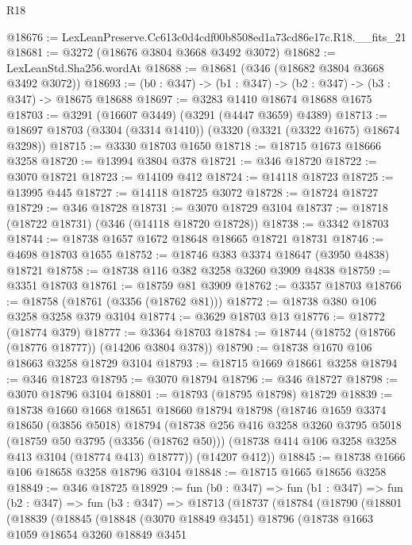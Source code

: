 \begin{lexlean}{R18}
\begin{coremodule}
@18676 := LexLeanPreserve.Cc613c0d4cdf00b8508ed1a73cd86e17c.R18.__fits_21
@18681 := @3272 (@18676 @3804 @3668 @3492 @3072)
@18682 := LexLeanStd.Sha256.wordAt
@18688 := @18681 (@346 (@18682 @3804 @3668 @3492 @3072))
@18693 := (b0 : @347) -> (b1 : @347) -> (b2 : @347) -> (b3 : @347) -> @18675 @18688
@18697 := @3283 @1410 @18674 @18688 @1675
@18703 := @3291 (@16607 @3449) (@3291 (@4447 @3659) @4389)
@18713 := @18697 @18703 (@3304 (@3314 @1410)) (@3320 (@3321 (@3322 @1675) @18674 @3298))
@18715 := @3330 @18703 @1650
@18718 := @18715 @1673 @18666 @3258
@18720 := @13994 @3804 @378
@18721 := @346 @18720
@18722 := @3070 @18721
@18723 := @14109 @412
@18724 := @14118 @18723
@18725 := @13995 @445
@18727 := @14118 @18725 @3072
@18728 := @18724 @18727
@18729 := @346 @18728
@18731 := @3070 @18729 @3104
@18737 := @18718 (@18722 @18731) (@346 (@14118 @18720 @18728))
@18738 := @3342 @18703
@18744 := @18738 @1657 @1672 @18648 @18665 @18721 @18731
@18746 := @4698 @18703 @1655
@18752 := @18746 @383 @3374 @18647 (@3950 @4838) @18721
@18758 := @18738 @116 @382 @3258 @3260 @3909 @4838
@18759 := @3351 @18703
@18761 := @18759 @81 @3909
@18762 := @3357 @18703
@18766 := @18758 (@18761 (@3356 (@18762 @81)))
@18772 := @18738 @380 @106 @3258 @3258 @379 @3104
@18774 := @3629 @18703 @13
@18776 := @18772 (@18774 @379)
@18777 := @3364 @18703
@18784 := @18744 (@18752 (@18766 (@18776 @18777)) (@14206 @3804 @378))
@18790 := @18738 @1670 @106 @18663 @3258 @18729 @3104
@18793 := @18715 @1669 @18661 @3258
@18794 := @346 @18723
@18795 := @3070 @18794
@18796 := @346 @18727
@18798 := @3070 @18796 @3104
@18801 := @18793 (@18795 @18798) @18729
@18839 := @18738
    @1660
    @1668
    @18651
    @18660
    @18794
    @18798
    (@18746
      @1659
      @3374
      @18650
      (@3856 @5018)
      @18794
      (@18738
        @256
        @416
        @3258
        @3260
        @3795
        @5018
        (@18759 @50 @3795 (@3356 (@18762 @50)))
        (@18738 @414 @106 @3258 @3258 @413 @3104 (@18774 @413) @18777))
      (@14207 @412))
@18845 := @18738 @1666 @106 @18658 @3258 @18796 @3104
@18848 := @18715 @1665 @18656 @3258
@18849 := @346 @18725
@18929 := fun (b0 : @347) =>
  fun (b1 : @347) =>
  fun (b2 : @347) =>
  fun (b3 : @347) =>
  @18713
    (@18737
      (@18784
        (@18790
          (@18801
            (@18839
              (@18845
                (@18848
                  (@3070 @18849 @3451)
                  @18796
                  (@18738
                    @1663
                    @1059
                    @18654
                    @3260
                    @18849
                    @3451

\end{coremodule}
\end{lexlean}
